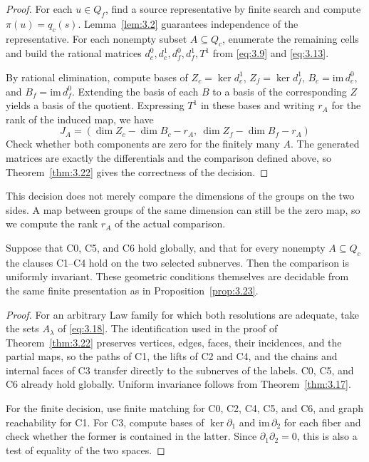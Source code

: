 \begin{proof}

For each $u\in Q_f$, find a source representative by finite search and compute
$\pi(u)=q_c(s)$.
Lemma~\ref{lem:3.2} guarantees independence of the representative.
For each nonempty subset $A\subseteq Q_c$, enumerate the remaining cells and build
the rational matrices $d_c^0,d_c^1,d_f^0,d_f^1,T^1$ from \eqref{eq:3.9} and \eqref{eq:3.13}.

By rational elimination, compute bases of $Z_c=\ker d_c^1$, $Z_f=\ker d_f^1$,
$B_c=\mathrm{im}\,d_c^0$, and $B_f=\mathrm{im}\,d_f^0$.
Extending the basis of each $B$ to a basis of the corresponding $Z$ yields a basis
of the quotient.
Expressing $T^1$ in these bases and writing $r_A$ for the rank of the induced map,
we have
\begin{equation*}
J_A=(\dim Z_c-\dim B_c-r_A,\
\dim Z_f-\dim B_f-r_A)
\tag{3.19}\label{eq:3.19}
\end{equation*}
Check whether both components are zero for the finitely many $A$.
The generated matrices are exactly the differentials and the comparison defined above, so
Theorem~\ref{thm:3.22} gives the correctness of the decision.

\end{proof}

This decision does not merely compare the dimensions of the groups on the two sides.
A map between groups of the same dimension can still be the zero map, so we compute
the rank $r_A$ of the actual comparison.

\begin{corollary}\label{cor:3.24}

Suppose that C0, C5, and C6 hold globally, and that for every nonempty
$A\subseteq Q_c$ the clauses C1--C4 hold on the two selected subnerves.
Then the comparison is uniformly invariant.
These geometric conditions themselves are decidable from the same finite
presentation as in Proposition~\ref{prop:3.23}.

\end{corollary}

\begin{proof}

For an arbitrary Law family for which both resolutions are adequate, take the sets
$A_\lambda$ of \eqref{eq:3.18}.
The identification used in the proof of Theorem~\ref{thm:3.22} preserves vertices,
edges, faces, their incidences, and the partial maps, so the paths of C1, the lifts
of C2 and C4, and the chains and internal faces of C3 transfer directly to the
subnerves of the labels.
C0, C5, and C6 already hold globally. Uniform invariance follows from
Theorem~\ref{thm:3.17}.

For the finite decision, use finite matching for C0, C2, C4, C5, and C6, and graph
reachability for C1.
For C3, compute bases of $\ker\partial_1$ and $\mathrm{im}\,\partial_2$ for each
fiber and check whether the former is contained in the latter.
Since $\partial_1\partial_2=0$, this is also a test of equality of the two spaces.

\end{proof}

